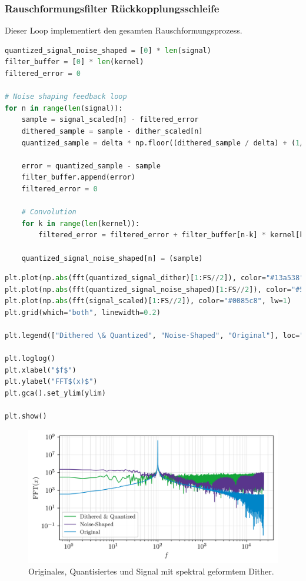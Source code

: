 \hypertarget{rauschformungsfilter-ruxfcckkopplungsschleife}{%
\subsubsection{Rauschformungsfilter
Rückkopplungsschleife}\label{rauschformungsfilter-ruxfcckkopplungsschleife}}

Dieser Loop implementiert den gesamten Rauschformungsprozess.

\begin{lstlisting}[language=Python]
quantized_signal_noise_shaped = [0] * len(signal)
filter_buffer = [0] * len(kernel)
filtered_error = 0

# Noise shaping feedback loop
for n in range(len(signal)):
    sample = signal_scaled[n] - filtered_error
    dithered_sample = sample - dither_scaled[n]
    quantized_sample = delta * np.floor((dithered_sample / delta) + (1/2))

    error = quantized_sample - sample
    filter_buffer.append(error)
    filtered_error = 0

    # Convolution
    for k in range(len(kernel)):
        filtered_error = filtered_error + filter_buffer[n-k] * kernel[k]

    quantized_signal_noise_shaped[n] = (sample)
\end{lstlisting}

\begin{lstlisting}[language=Python]
plt.plot(np.abs(fft(quantized_signal_dither)[1:FS//2]), color="#13a538", lw=1)
plt.plot(np.abs(fft(quantized_signal_noise_shaped)[1:FS//2]), color="#59358c", lw=1)
plt.plot(np.abs(fft(signal_scaled)[1:FS//2]), color="#0085c8", lw=1)
plt.grid(which="both", linewidth=0.2)

plt.legend(["Dithered \& Quantized", "Noise-Shaped", "Original"], loc="lower left", fontsize="small")

plt.loglog()
plt.xlabel("$f$")
plt.ylabel("FFT$(x)$")
plt.gca().set_ylim(ylim)

plt.show()
\end{lstlisting}

\begin{figure}
  \centering
  \includegraphics{./img/9dd2df13a0e0795ec7f78029c2fd327701bd8ea4.png}
  \caption[Originales, Quantisiertes und Signal mit spektral geformtem Dither]{Originales, Quantisiertes und Signal mit spektral geformtem Dither.}
\end{figure}

